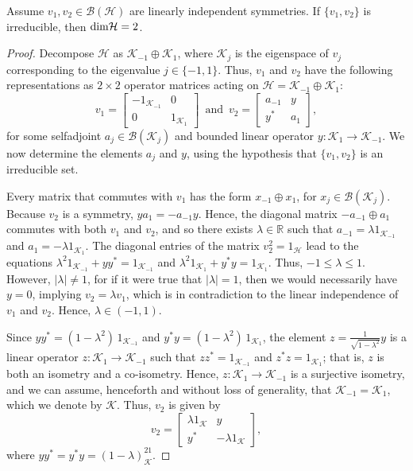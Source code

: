 \documentclass[10pt,a4paper]{amsart}
\newcommand{\B}{\mathcal{B}}
\newcommand{\K}{\mathcal K}
\renewcommand{\H}{\mathcal{H}}
\begin{document}
\begin{theorem}\label{thm d=2}
Assume $v_1,v_2\in\B(\H)$ are linearly independent symmetries.  
	If $\{v_1,v_2\}$ is irreducible, then $\mbox{\textrm dim}\H=2$.
\end{theorem}

\begin{proof} Decompose $\H$ as $\K_{-1}\oplus\K_{1}$, 
	where $\K_j$ is the eigenspace of $v_j$ corresponding to the eigenvalue $j\in\{-1,1\}$. Thus, $v_1$ and
	$v_2$ have the following representations as $2\times 2$ operator matrices acting on $\H=\K_{-1}\oplus\K_{1}$:
	\[
	v_1=\left[ \begin{array}{cc} -1_{\K_{-1}} &0 \\ 0 & 1_{\K_1} \end{array}\right]
	\,\mbox{ and }\,
	v_2=\left[ \begin{array}{cc} a_{-1}&y \\ y^* & a_{1} \end{array}\right],
	\]
	for some selfadjoint $a_j\in\B(\K_j)$ and bounded linear operator $y:\K_{1}\rightarrow\K_{-1}$.
	We now determine the elements $a_j$ and $y$, using the hypothesis that $\{v_1,v_2\}$ is an irreducible set.
	
	Every matrix that commutes with $v_1$ has the form $x_{-1}\oplus x_{1}$, for $x_j\in\B(\K_j)$.
	Because $v_2$ is a symmetry, $ya_{1}=-a_{-1}y$. Hence, the diagonal matrix 
	$-a_{-1}\oplus a_{1}$
	commutes with both $v_1$ and $v_2$, and so there exists
	$\lambda\in\mathbb R$ such that $a_{-1}=\lambda1_{\K_{-1}}$ and
	$a_1=-\lambda1_{\K_1}$. The diagonal entries of the matrix 
	$v_2^2=1_\H$ lead to the equations $\lambda^2 1_{\K_{-1}}+yy^*=1_{\K_{-1}}$ and
	$\lambda^2 1_{\K_{1}}+y^*y=1_{\K_{1}}$. Thus, $-1\leq\lambda\leq1$. However, $|\lambda|\not=1$, 
	for if it were true that $|\lambda|=1$, then we would necessarily have $y=0$, implying $v_2=\lambda v_1$,
	which is in contradiction to the linear independence of $v_1$ and $v_2$. Hence, $\lambda\in(-1,1)$.
	
	Since $yy^*=(1-\lambda^2)\,1_{\K_{-1}}$ and $y^*y=(1-\lambda^2)\,1_{\K_{1}}$, the element $z=\frac{1}{\sqrt{1-\lambda^2}}y$ 
	is a linear operator $z:\K_{1}\rightarrow\K_{{-1}}$ such that $zz^*=1_{\K_{-1}}$ and $z^*z=1_{\K_{1}}$; that is, $z$ is both an isometry
	and a co-isometry. Hence, $z:\K_{1}\rightarrow\K_{-1}$ is a surjective isometry, and we can assume, henceforth
	and without loss of generality, that $\K_{-1}=\K_1$, which we denote by $\K$. Thus, $v_2$ is given by
	\[
	v_2=\left[\begin{array}{cc} \lambda 1_\K & y \\ y^* & -\lambda 1_\K\end{array}\right],
	\]
	where $yy^*=y^*y=(1-\lambda)^21_\K$.
	

\end{proof}
\end{document}
